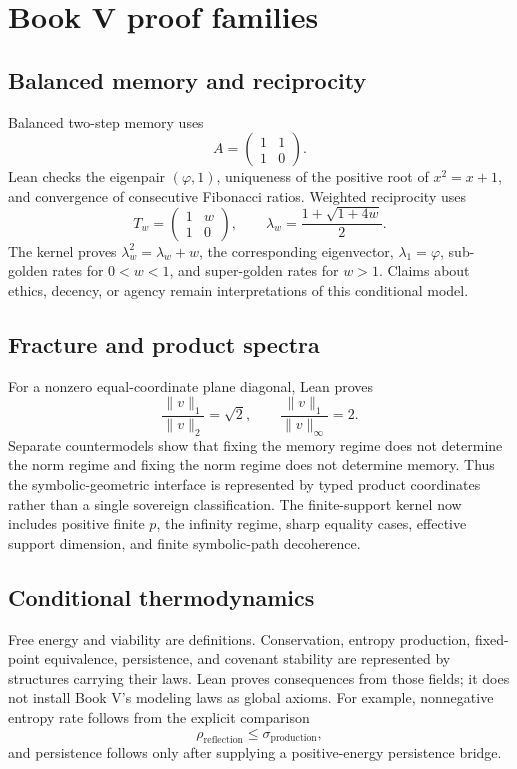 \documentclass[11pt]{article}
\begin{document}
\section{Book V proof families}

\subsection{Balanced memory and reciprocity}

Balanced two-step memory uses
\[
 A=\begin{pmatrix}1&1\\1&0\end{pmatrix}.
\]
Lean checks the eigenpair $(\varphi,1)$, uniqueness of the positive root of
$x^2=x+1$, and convergence of consecutive Fibonacci ratios.  Weighted
reciprocity uses
\[
 T_w=\begin{pmatrix}1&w\\1&0\end{pmatrix},\qquad
 \lambda_w=\frac{1+\sqrt{1+4w}}2.
\]
The kernel proves $\lambda_w^2=\lambda_w+w$, the corresponding eigenvector,
$\lambda_1=\varphi$, sub-golden rates for $0<w<1$, and super-golden rates for
$w>1$.  Claims about ethics, decency, or agency remain interpretations of this
conditional model.

\subsection{Fracture and product spectra}

For a nonzero equal-coordinate plane diagonal, Lean proves
\[
 \frac{\|v\|_1}{\|v\|_2}=\sqrt2,
 \qquad
 \frac{\|v\|_1}{\|v\|_\infty}=2.
\]
Separate countermodels show that fixing the memory regime does not determine
the norm regime and fixing the norm regime does not determine memory.  Thus the
symbolic-geometric interface is represented by typed product coordinates
rather than a single sovereign classification.  The finite-support kernel now
includes positive finite $p$, the infinity regime, sharp equality cases,
effective support dimension, and finite symbolic-path decoherence.

\subsection{Conditional thermodynamics}

Free energy and viability are definitions.  Conservation, entropy production,
fixed-point equivalence, persistence, and covenant stability are represented by
structures carrying their laws.  Lean proves consequences from those fields;
it does not install Book V's modeling laws as global axioms.  For example,
nonnegative entropy rate follows from the explicit comparison
\[
  \rho_{\mathrm{reflection}}\leq\sigma_{\mathrm{production}},
\]
and persistence follows only after supplying a positive-energy persistence
bridge.
\end{document}
